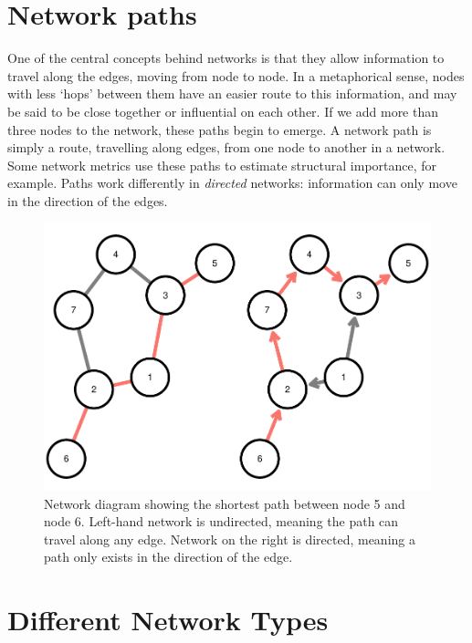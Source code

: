 \documentclass[
]{book}
\begin{document}
\hypertarget{network-paths}{%
\section{Network paths}\label{network-paths}}

One of the central concepts behind networks is that they allow information to travel along the edges, moving from node to node. In a metaphorical sense, nodes with less `hops' between them have an easier route to this information, and may be said to be close together or influential on each other. If we add more than three nodes to the network, these paths begin to emerge. A network path is simply a route, travelling along edges, from one node to another in a network. Some network metrics use these paths to estimate structural importance, for example. Paths work differently in \emph{directed} networks: information can only move in the direction of the edges.

\begin{figure}
\centering
\includegraphics{_main_files/figure-latex/unnamed-chunk-1-1.pdf}
\caption{\label{fig:unnamed-chunk-1}Network diagram showing the shortest path between node 5 and node 6. Left-hand network is undirected, meaning the path can travel along any edge. Network on the right is directed, meaning a path only exists in the direction of the edge.}
\end{figure}

\hypertarget{different-network-types}{%
\section{Different Network Types}\label{different-network-types}}
\end{document}
